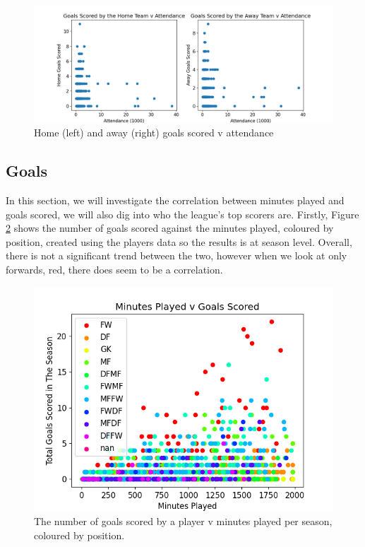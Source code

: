 \documentclass[12pt, a4paper, twocolumn]{article}
\begin{document}
\begin{figure}
  \includegraphics[width=\linewidth]{../vis/fixtures/attendance_v_goals.png}
  \caption{Home (left) and away (right) goals scored v attendance}
  \label{att_v_goals}
\end{figure}

\subsection{Goals}

In this section, we will investigate the correlation between minutes played and goals scored, we will also dig into who the league's top scorers are. Firstly, Figure \ref{goal_min} shows the number of goals scored against the minutes played, coloured by position, created using the players data so the results is at season level. Overall, there is not a significant trend between the two, however when we look at only forwards, red, there does seem to be a correlation.

\begin{figure}
  \includegraphics[width=\linewidth]{../vis/playerStats/goal_minutes}
  \caption{The number of goals scored by a player v minutes played per season, coloured by position.}
  \label{goal_min}
\end{figure}
\end{document}

